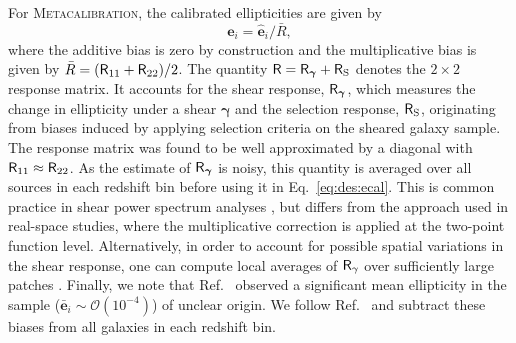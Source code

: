 \documentclass[a4paper,11pt]{article}
\newcommand{\shear}{\boldsymbol{\gamma}}
\newcommand{\ellip}{\boldsymbol{e}}
\newcommand{\mcal}{\textsc{Metacalibration}}
\begin{document}
      For \mcal{}, the calibrated ellipticities are given by 
      \begin{equation}\label{eq:des:ecal}
        \ellip_i=\hat{\ellip}_i/\bar{R},
      \end{equation}
      where the additive bias is zero by construction and the multiplicative bias is given by $\bar{R}=({\sf R}_{11}+{\sf R}_{22})/2$. The quantity ${\sf R}={\sf R}_{\shear}+{\sf R}_{\rm S}$ denotes the $2\times 2$ response matrix. It accounts for the shear response, ${\sf R}_{\shear}$, which measures the change in ellipticity under a shear $\shear$ and the selection response, ${\sf R}_{\rm S}$, originating from biases induced by applying selection criteria on the sheared galaxy sample. The response matrix was found to be well approximated by a diagonal with ${\sf R}_{11} \approx {\sf R}_{22}$. As the estimate of ${\sf R}_{\shear}$ is noisy, this quantity is averaged over all sources in each redshift bin before using it in Eq.~\ref{eq:des:ecal}. This is common practice in shear power spectrum analyses \citep{1507.05598,1509.04071,1809.09148}, but differs from the approach used in real-space studies, where the multiplicative correction is applied at the two-point function level. Alternatively, in order to account for possible spatial variations in the shear response, one can compute local averages of ${\sf R}_\gamma$ over sufficiently large patches \citep{1903.04957}. Finally, we note that Ref.~\cite{1708.01538} observed a significant mean ellipticity in the sample ($\bar{\ellip}_i\sim\mathcal{O}(10^{-4})$) of unclear origin. We follow Ref.~\cite{1708.01538} and subtract these biases from all galaxies in each redshift bin.
\end{document}
